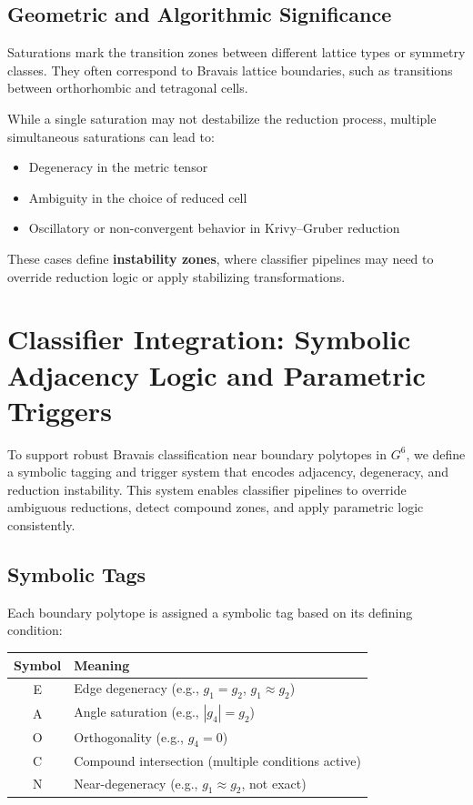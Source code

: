 \documentclass[preprint]{iucr}              %
\begin{document}
\subsection*{Geometric and Algorithmic Significance}

Saturations mark the transition zones between different lattice types or symmetry classes. They often correspond to Bravais lattice boundaries, such as transitions between orthorhombic and tetragonal cells.

While a single saturation may not destabilize the reduction process, multiple simultaneous saturations can lead to:

\begin{itemize}
	\item Degeneracy in the metric tensor
	\item Ambiguity in the choice of reduced cell
	\item Oscillatory or non-convergent behavior in Krivy--Gruber reduction
\end{itemize}

These cases define \textbf{instability zones}, where classifier pipelines may need to override reduction logic or apply stabilizing transformations.


\section*{Classifier Integration: Symbolic Adjacency Logic and Parametric Triggers}

To support robust Bravais classification near boundary polytopes in $G^6$, we define a symbolic tagging and trigger system that encodes adjacency, degeneracy, and reduction instability. This system enables classifier pipelines to override ambiguous reductions, detect compound zones, and apply parametric logic consistently.

\subsection*{Symbolic Tags}

Each boundary polytope is assigned a symbolic tag based on its defining condition:

\begin{center}
	\begin{tabular}{|c|l|}
		\hline
		\textbf{Symbol} & \textbf{Meaning} \\
		\hline
		E & Edge degeneracy (e.g., $g_1 = g_2$, $g_1 \approx g_2$) \\
		A & Angle saturation (e.g., $|g_4| = g_2$) \\
		O & Orthogonality (e.g., $g_4 = 0$) \\
		C & Compound intersection (multiple conditions active) \\
		N & Near-degeneracy (e.g., $g_1 \approx g_2$, not exact) \\
		\hline
	\end{tabular}
\end{center}
\end{document}
